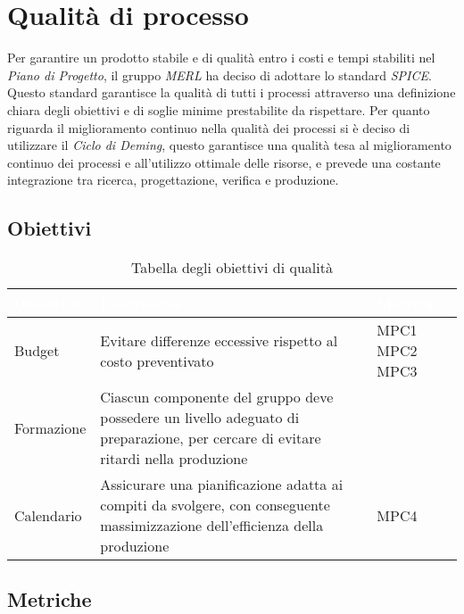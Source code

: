 \chapter{Qualità di processo}
Per garantire un prodotto stabile e di qualità entro i costi e tempi stabiliti nel \textit{Piano di Progetto}, il gruppo \textit{MERL} ha deciso di adottare lo standard \textit{SPICE}. Questo standard garantisce la qualità di tutti i processi attraverso una definizione chiara degli obiettivi e di soglie minime prestabilite da rispettare.
Per quanto riguarda il miglioramento continuo nella qualità dei processi si è deciso di utilizzare il \textit{Ciclo di Deming}, questo garantisce una qualità tesa al miglioramento continuo dei processi e all'utilizzo ottimale delle risorse, e prevede una costante integrazione tra ricerca, progettazione, verifica e produzione.

\section{Obiettivi}
\begin{table}[H]
  \renewcommand{\arraystretch}{1.25}
  \begin{tabular}{|p{2.5cm}|p{8cm}|p{1.7cm}|} \hline
    \rowcolor[HTML]{036400}
    \textcolor{white}{\textbf{Obiettivo}} & \textcolor{white}{\textbf{Descrizione}} & \textcolor{white}{\textbf{Metrica}}  \\ \hline
    \rowcolor[HTML]{EFEFEF}
    Budget & Evitare differenze eccessive rispetto al costo preventivato & MPC1 \newline MPC2 \newline MPC3     \\ \hline
    \rowcolor[HTML]{C0C0C0}
    Formazione & Ciascun componente del gruppo deve possedere un livello adeguato di preparazione, per cercare di evitare ritardi nella produzione   & \    \\ \hline
    \rowcolor[HTML]{EFEFEF}
    Calendario & Assicurare una pianificazione adatta ai compiti da svolgere, con conseguente massimizzazione dell'efficienza della produzione  & MPC4       \\ \hline
  \end{tabular}
  \caption{Tabella degli obiettivi di qualità}
\end{table}

\section{Metriche}

